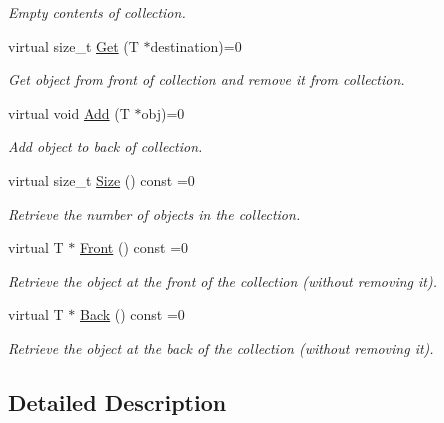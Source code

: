 \begin{DoxyCompactItemize}
\begin{DoxyCompactList}\small\item\em Empty contents of collection. \item\end{DoxyCompactList}\item 
virtual size\_\-t \hyperlink{class_store_abbe385f839e6bd682d84a7a3b2374774}{Get} (T $\ast$destination)=0
\begin{DoxyCompactList}\small\item\em Get object from front of collection and remove it from collection. \item\end{DoxyCompactList}\item 
virtual void \hyperlink{class_store_a18a77de2e4fce1e80413c2d122fa3906}{Add} (T $\ast$obj)=0
\begin{DoxyCompactList}\small\item\em Add object to back of collection. \item\end{DoxyCompactList}\item 
virtual size\_\-t \hyperlink{class_store_a24ce67007b2c9c65eb0542415a8d0cac}{Size} () const =0
\begin{DoxyCompactList}\small\item\em Retrieve the number of objects in the collection. \item\end{DoxyCompactList}\item 
virtual T $\ast$ \hyperlink{class_store_ac176e1bb63ac3b34a574cf3cc5d4d1a1}{Front} () const =0
\begin{DoxyCompactList}\small\item\em Retrieve the object at the front of the collection (without removing it). \item\end{DoxyCompactList}\item 
virtual T $\ast$ \hyperlink{class_store_ae00374bb6e2216fc02e84016b8980f75}{Back} () const =0
\begin{DoxyCompactList}\small\item\em Retrieve the object at the back of the collection (without removing it). \item\end{DoxyCompactList}\end{DoxyCompactItemize}


\subsection{Detailed Description}

